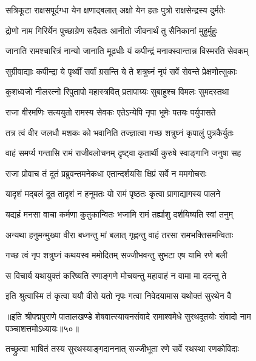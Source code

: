 \twolineshloka
{सत्रिकूटा राक्षसपूर्दग्धा येन क्षणाद्बलात्}
{अक्षो येन हतः पुत्रो राक्षसेन्द्रस्य दुर्मतेः}%

\twolineshloka
{द्रोणो नाम गिरिर्येन पुच्छाग्रेण सदैवतः}
{आनीतो जीवनार्थं तु सैनिकानां मुहुर्मुहुः}%

\twolineshloka
{जानाति रामश्चारित्रं नान्यो जानाति मूढधीः}
{यं कपीन्द्रं मनाक्स्वान्तान्न विस्मरति सेवकम्}%

\twolineshloka
{सुग्रीवाद्याः कपीन्द्रा ये पृथ्वीं सर्वां ग्रसन्ति ये}
{ते शत्रुघ्नं नृपं सर्वे सेवन्ते प्रेक्षणोत्सुकाः}%

\twolineshloka
{कुशध्वजो नीलरत्नो रिपुतापो महास्त्रवित्}
{प्रतापाग्र्यः सुबाहुश्च विमलः सुमदस्तथा}%

\twolineshloka
{राजा वीरमणिः सत्ययुतो रामस्य सेवकः}
{एतेऽन्येपि नृपा भूमेः पतयः पर्युपासते}%

\twolineshloka
{तत्र त्वं वीर जलधौ मशकः को भवानिति}
{तज्ज्ञात्वा गच्छ शत्रुघ्नं कृपालुं पुत्रकैर्युतः}%

\twolineshloka
{वाहं समर्प्य गन्तासि रामं राजीवलोचनम्}
{दृष्ट्वा कृतार्थी कुरुषे स्वाङ्गानि जनुषा सह}%


\twolineshloka
{राजा प्रोवाच तं दूतं प्रब्रुवन्तमनेकधा}
{एतान्दर्शयसि क्षिप्रं सर्वे न ममगोचराः}%

\twolineshloka
{यादृशं मद्बलं दूत तादृशं न हनूमतः}
{यो रामं पृष्ठतः कृत्वा प्रागाद्यागस्य पालने}%

\twolineshloka
{यद्यहं मनसा वाचा कर्मणा कुतुकान्वितः}
{भजामि रामं तर्ह्याशु दर्शयिष्यति स्वां तनुम्}%

\twolineshloka
{अन्यथा हनुमन्मुख्या वीरा बध्नन्तु मां बलात्}
{गृह्णन्तु वाहं तरसा रामभक्तिसमन्विताः}%

\twolineshloka
{गच्छ त्वं नृप शत्रुघ्नं कथयस्व ममोदितम्}
{सज्जीभवन्तु सुभटा एष यामि रणे बली}%

\twolineshloka
{स विचार्य यथायुक्तं करिष्यति रणाङ्गणे}
{मोचयन्तु महावाहं न वामा मा ददन्तु ते}%


\twolineshloka
{इति श्रुत्वास्मि तं कृत्वा ययौ वीरो यतो नृपः}
{गत्वा निवेदयामास यथोक्तं सुरथेन वै}%

॥इति श्रीपद्मपुराणे पातालखण्डे शेषवात्स्यायनसंवादे रामाश्वमेधे सुरथदूतयोः संवादो नाम पञ्चाशत्तमोऽध्यायः॥५०॥



\twolineshloka
{तच्छ्रुत्वा भाषितं तस्य सुरथस्याङ्गदाननात्}
{सज्जीभूता रणे सर्वे रथस्था रणकोविदाः}%

